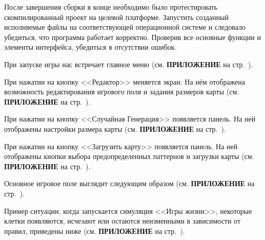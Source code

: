 После завершения сборки в конце необходимо было протестировать скомпилированный проект на целевой платформе. Запустить созданный исполняемые файлы на соответствующей операционной системе и следовало убедиться, что программа работает корректно. Проверив все основные функции и элементы интерфейса, убедиться в отсутствии ошибок. 

При запуске игры нас встречает главное меню (см. \textbf{\textsc{ПРИЛОЖЕНИЕ}} на стр.~\pageref{MainM}).

При нажатии на кнопку <<Редактор>> меняется экран. На нём отображена возможность редактирования игрового поля и задания размеров карты (см. \textbf{\textsc{ПРИЛОЖЕНИЕ}} на стр.~\pageref{Editor}). 

При нажатии на кнопку <<Случайная Генерация>> появляется панель. На ней отображены настройки размера карты (см. \textbf{\textsc{ПРИЛОЖЕНИЕ}} на стр.~\pageref{rand}). 

При нажатии на кнопку <<Загрузить карту>> появляется панель. На ней отображены кнопки выбора предопределенных паттернов и загрузки карты (см. \textbf{\textsc{ПРИЛОЖЕНИЕ}} на стр.~\pageref{downl}). 

Основное игровое поле выглядит следующим образом (см. \textbf{\textsc{ПРИЛОЖЕНИЕ}} на стр.~\pageref{map}).

Пример ситуации, когда запускается симуляция <<Игры жизни>>, некоторые клетки появляются, исчезают или остаются неизменными в зависимости от правил, приведены ниже (см. \textbf{\textsc{ПРИЛОЖЕНИЕ}} на стр.~\pageref{uim}).
